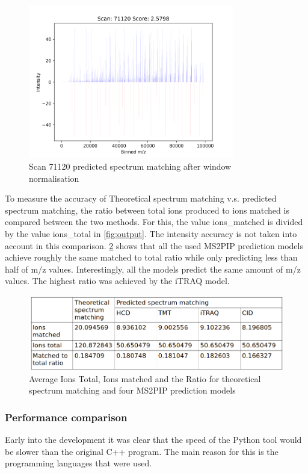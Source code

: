\documentclass[11pt]{article}
\begin{document}
\begin{figure}[ht]
\centering
\includegraphics[width=0.8\textwidth]{figs/scan_71120_ps=True_wins.png}
\caption{Scan 71120 predicted spectrum matching after window normalisation}
\label{fig:scanwin}
\end{figure}

To measure the accuracy of Theoretical spectrum matching v.s. predicted spectrum matching, the ratio between total ions produced to ions matched is compared between the two methods. For this, the value ions\_matched is divided by the value ions\_total in \cref{fig:output}. The intensity accuracy is not taken into account in this comparison. \cref{fig:ratio_table} shows that all the used MS2PIP prediction models achieve roughly the same matched to total ratio while only predicting less than half of m/z values. Interestingly, all the models predict the same amount of m/z values. The highest ratio was achieved by the iTRAQ model.

\begin{figure}[ht]
\centering
\includegraphics[width=1\textwidth]{figs/ratio_table.png}
\caption{Average Ions Total, Ions matched and the Ratio for theoretical spectrum matching and four MS2PIP prediction models}
\label{fig:ratio_table}
\end{figure}

\subsubsection{Performance comparison}
Early into the development it was clear that the speed of the Python tool would be slower than the original C++ program. The main reason for this is the programming languages that were used. 
\end{document}
